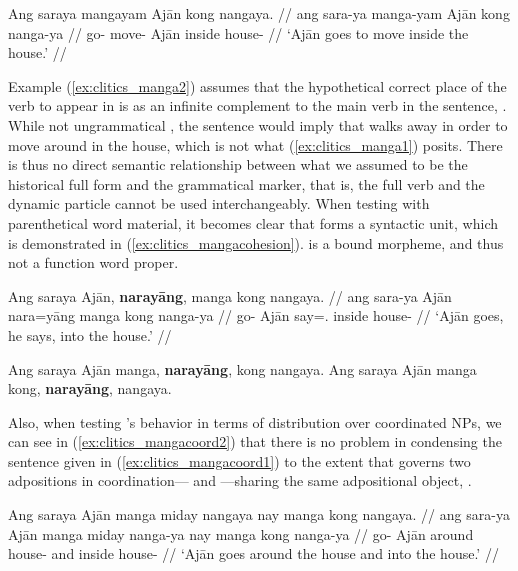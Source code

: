 \a\label{ex:clitics_manga2}\ljudge{\excl}\begingl
\gla Ang saraya mangayam Ajān kong nangaya. //
	\glb ang sara-ya manga-yam Ajān kong nanga-ya //
	\glc \AgtT{} go-\TsgM{} move-\Ptcp{} Ajān inside house-\Loc{} //
	\glft `Ajān goes to move inside the house.' //
\endgl
\xe

Example (\ref{ex:clitics_manga2}) assumes that the hypothetical correct place
of the verb  to appear in is as an infinite complement
to the main verb in the sentence, . While not
ungrammatical , the sentence would imply that 
walks away in order to move around in the house, which is not what
(\ref{ex:clitics_manga1}) posits. There is thus no direct semantic relationship
between what we assumed to be the historical full form and the grammatical
marker, that is, the full verb and the dynamic particle cannot be used
interchangeably. When testing with parenthetical word material, it becomes
clear that  forms a syntactic unit, which is
demonstrated in (\ref{ex:clitics_mangacohesion}).  is a bound
morpheme, and thus not a function word proper.

\pex\label{ex:clitics_mangacohesion}
\a\label{ex:clitics_mangacohesion1}\begingl
	\gla Ang saraya Ajān, \textbf{narayāng}, manga kong nangaya. //
	\glb ang sara-ya Ajān nara=yāng manga kong nanga-ya //
	\glc \AgtT{} go-\TsgM{} Ajān say=\TsgM{}.\Aarg{} \Dyn{} inside 
		house-\Loc{} //
	\glft `Ajān goes, he says, into the house.' //
\endgl

\a\label{ex:clitics_mangacohesion2}
	\ljudge{*} Ang saraya Ajān manga, \textbf{narayāng}, kong nangaya.
\a\label{ex:clitics_mangacohesion3}
	Ang saraya Ajān manga kong, \textbf{narayāng}, nangaya.
\xe

Also, when testing 's behavior in terms of distribution over
coordinated NPs, we can see in (\ref{ex:clitics_mangacoord2}) that there is no
problem in condensing the sentence given in (\ref{ex:clitics_mangacoord1}) to
the extent that  governs two adpositions in
coordination--- and
---sharing the same adpositional object,
.

\pex\label{ex:clitics_mangacoord}
\a\label{ex:clitics_mangacoord1}\begingl
	\gla Ang saraya Ajān manga miday nangaya nay manga kong nangaya. //
	\glb ang sara-ya Ajān manga miday nanga-ya nay manga kong nanga-ya //
	\glc \AgtT{} go-\TsgM{} Ajān \Dyn{} around house-\Loc{} and \Dyn{} inside
		house-\Loc{} //
	\glft `Ajān goes around the house and into the house.' //
\endgl


